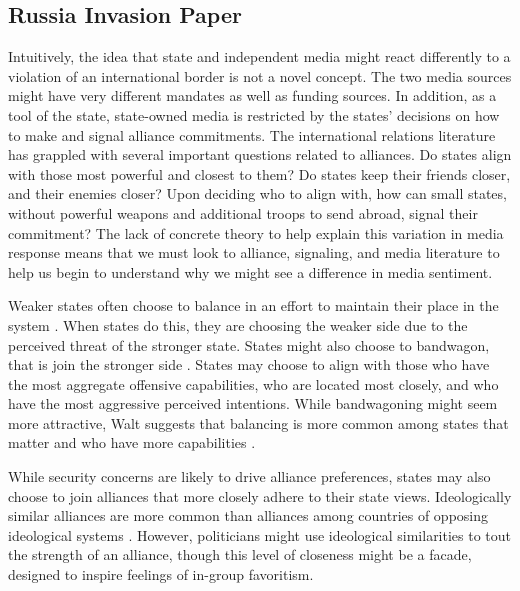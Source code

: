 \documentclass[12pt]{article}
\begin{document}
\subsection*{Russia Invasion Paper}

Intuitively, the idea that state and independent media might react differently to a violation of an international border is not a novel concept. The two media sources might have very different mandates as well as funding sources. In addition, as a tool of the state, state-owned media is restricted by the states' decisions on how to make and signal alliance commitments. The international relations literature has grappled with several important questions related to alliances. Do states align with those most powerful and closest to them? Do states keep their friends closer, and their enemies closer? Upon deciding who to align with, how can small states, without powerful weapons and additional troops to send abroad, signal their commitment? The lack of concrete theory to help explain this variation in media response means that we must look to alliance, signaling, and media literature to help us begin to understand why we might see a difference in media sentiment. 

Weaker states often choose to balance in an effort to maintain their place in the system \autocite{waltz_theory_2010}. When states do this, they are choosing the weaker side due to the perceived threat of the stronger state. States might also choose to bandwagon, that is join the stronger side \autocite{waltz_theory_2010, walt_origins_2007}. States may choose to align with those who have the most aggregate offensive capabilities, who are located most closely, and who have the most aggressive perceived intentions. While bandwagoning might seem more attractive, Walt suggests that balancing is more common among states that matter and who have more capabilities \autocite{walt_origins_2007}. 

While security concerns are likely to drive alliance preferences, states may also choose to join alliances that more closely adhere to their state views. Ideologically similar alliances are more common than alliances among countries of opposing ideological systems \autocite{walt_origins_2007}. However, politicians might use ideological similarities to tout the strength of an alliance, though this level of closeness might be a facade, designed to inspire feelings of in-group favoritism. 
\end{document}

